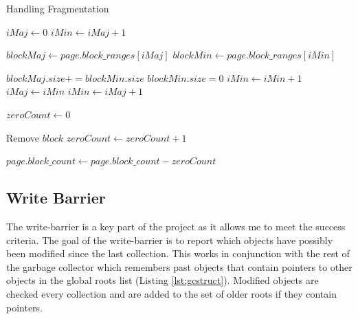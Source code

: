 \documentclass[../diss.tex]{subfiles}
\begin{document}
\begin{algorithm}
\caption{Handling Fragmentation}
\label{alg:fragmentation}
\begin{algorithmic}


\State {}

\State

\State $iMaj\gets 0$
\State $iMin\gets iMaj + 1$


    \State $blockMaj\gets page.block\_ranges[iMaj]$ 
    \State $blockMin\gets page.block\_ranges[iMin]$ 
    
    \State
    
        \State $blockMaj.size += blockMin.size$
        \State $blockMin.size = 0$
        \State $iMin\gets iMin + 1$
    \Else
        \State $iMaj\gets iMin$
        \State $iMin\gets iMaj + 1$
    \EndIf

\EndWhile

\State

\State $zeroCount\gets 0$

        \State Remove $block$
        \State $zeroCount\gets zeroCount + 1$
    \EndIf
\EndFor

\State $page.block\_count\gets page.block\_count - zeroCount$

\EndFunction

\end{algorithmic}
\end{algorithm}

\subsection{Write Barrier} \label{sec:writebarrier}

The write-barrier is a key part of the project as it allows me to meet the success criteria. The goal of the write-barrier is to report which objects have possibly been modified since the last collection. This works in conjunction with the rest of the garbage collector which remembers past objects that contain pointers to other objects in the global roots list (Listing \ref{lst:gcstruct}). Modified objects are checked every collection and are added to the set of older roots if they contain pointers.
\end{document}
